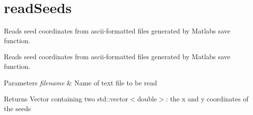 \hypertarget{group__readSeeds}{}\section{read\+Seeds}
\label{group__readSeeds}


Reads seed coordinates from ascii-\/formatted files generated by Matlab\textquotesingle{}s \textquotesingle{}save\textquotesingle{} function.  


Reads seed coordinates from ascii-\/formatted files generated by Matlab\textquotesingle{}s \textquotesingle{}save\textquotesingle{} function. 


\begin{DoxyParams}{Parameters}
{\em filename} & Name of text file to be read \\
\hline
\end{DoxyParams}
\begin{DoxyReturn}{Returns}
Vector containing two std\+::vector$<$double$>$\+: the x and y coordinates of the seeds 
\end{DoxyReturn}
